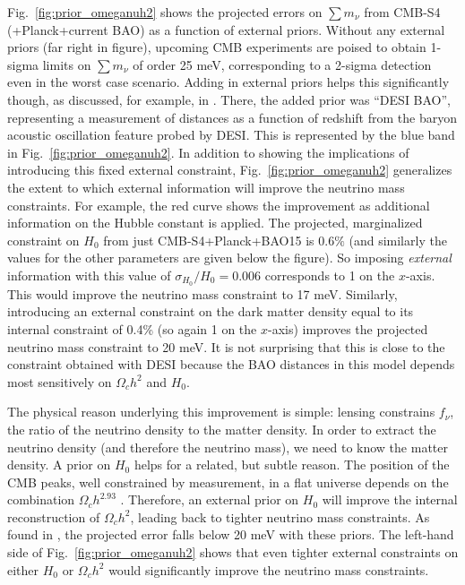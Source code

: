 \documentclass[aps,prd,reprint,superscriptaddress]{revtex4-1}
\newcommand{\reffig}[1]{Fig.~\ref{fig:#1}}
\begin{document}
\reffig{prior_omeganuh2} shows the projected errors on $\sum m_\nu$ from CMB-S4 (+Planck+current BAO) as a function of external priors. 
Without any external priors (far right in figure), upcoming CMB experiments are poised to obtain 1-sigma limits on $\sum m_\nu$ of order 25 meV, corresponding to a 2-sigma detection even in the worst case scenario. Adding in external priors helps this significantly though, as discussed, for example, in \cite{2013arXiv1309.5383A,pan:2015,allison:2015}. 
There, the added prior was ``DESI BAO'', representing a measurement of distances as a function of redshift from the baryon acoustic oscillation feature probed by DESI. This is represented by the blue band in \reffig{prior_omeganuh2}. In addition to showing the implications of introducing this fixed external constraint, \reffig{prior_omeganuh2} generalizes the extent to which external information will improve the neutrino mass constraints. For example, the red curve shows the improvement as additional information on the Hubble constant is applied. The projected, marginalized constraint on $H_0$ from just CMB-S4+Planck+BAO15 is $0.6\%$ (and similarly the values for the other parameters are given below the figure). So imposing {\it external} information with this value of $\sigma_{H_0}/H_0=0.006$ corresponds to 1 on the $x$-axis. This would improve the neutrino mass constraint to 17 meV. Similarly, introducing an external constraint on the dark matter density equal to its internal constraint of 0.4\% (so again 1 on the $x$-axis) improves the projected neutrino mass constraint to 20 meV. It is not surprising that this is close to the constraint obtained with DESI because the BAO distances in this model depends most sensitively on $\Omega_ch^2$ and $H_{0}$.

The physical reason underlying this improvement is simple: lensing constrains $f_\nu$, the ratio of the neutrino density to the matter density. In order to extract the neutrino density (and therefore the neutrino mass), we need to know the matter density. A prior on $H_{0}$ helps for a related, but subtle reason. 
The position of the CMB peaks, well constrained by measurement, in a flat universe depends on the combination $\Omega_ch^{2.93}$ \cite{planck-collaboration:2014} 
. Therefore, an external prior on $H_{0}$ will improve the internal reconstruction of $\Omega_ch^2$, leading back to tighter neutrino mass constraints.
As found in \cite{2013arXiv1309.5383A,pan:2015,allison:2015}, the projected error falls below 20 meV with these priors. 
The left-hand side of \reffig{prior_omeganuh2} shows that even tighter external constraints on either $H_0$ or $\Omega_ch^2$ would significantly improve the neutrino mass constraints.
\end{document}
